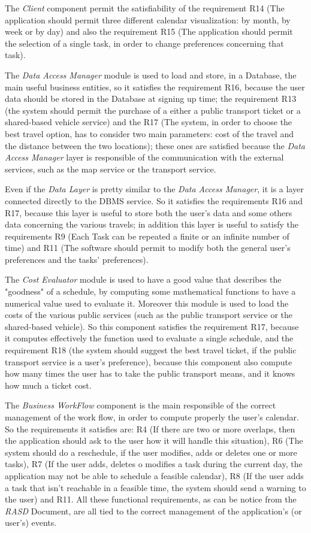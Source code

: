 The \emph{Client} component permit the satisfiability of the requirement R14 (The application should permit three different calendar visualization: by month, by week or by day) and also the requirement R15 (The application should permit the selection of a single task, in order to change preferences concerning that task).

The \emph{Data Access Manager} module is used to load and store, in a Database, the main useful business entities, so it satisfies the requirement R16, because the user data should be stored in the Database at signing up time; the requirement R13 (the system should permit the purchase of a either a public transport ticket or a shared-based vehicle service) and the R17 (The system, in order to choose the best travel option, has to consider two main parameters: cost of the travel and the distance between the two locations); these ones are satisfied because the \emph{Data Access Manager} layer is responsible of the communication with the external services, such as the map service or the transport service.

Even if the \emph{Data Layer} is pretty similar to the \emph{Data Access Manager}, it is a layer connected directly to the DBMS service. So it satisfies the requirements R16 and R17, because this layer is useful to store both the user's data and some others data concerning the various travels; in addition this layer is useful to satisfy the requirements R9 (Each Task can be repeated a finite or an infinite number of time) and R11 (The software should permit to modify both the general user's preferences and the tasks' preferences).

The \emph{Cost Evaluator} module is used to have a good value that describes the "goodness" of a schedule, by computing some mathematical functions to have a numerical value used to evaluate it. Moreover this module is used to load the costs of the various public services (such as the public transport service or the shared-based vehicle). So this component satisfies the requirement R17, because it computes effectively the function used to evaluate a single schedule, and the requirement R18 (the system should suggest the best travel ticket, if the public transport service is a user's preference), because this component also compute how many times the user has to take the public transport means, and it knows how much a ticket cost.

The \emph{Business WorkFlow} component is the main responsible of the correct management of the work flow, in order to compute properly the user's calendar. So the requirements it satisfies are: R4 (If there are two or more overlaps, then the application should ask to the user how it will handle this situation), R6 (The system should do a reschedule, if the user modifies, adds or deletes one or more tasks), R7 (If the user adds, deletes o modifies a task during the current day, the application may not be able to schedule a feasible calendar), R8 (If the user adds a task that isn't reachable in a feasible time, the system should send a warning to the user) and R11. All these functional requirements, as can be notice from the \emph{RASD} Document, are all tied to the correct management of the application's (or user's) events.

